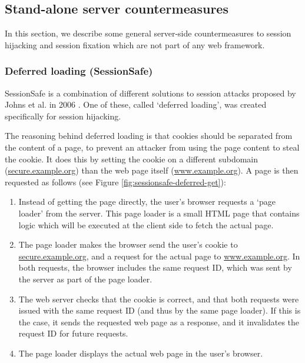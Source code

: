 \subsection{Stand-alone server countermeasures}\label{standalone-server}

In this section, we describe some general server-side countermeasures to session hijacking and session fixation which are not part of any web framework.

\subsubsection{Deferred loading (SessionSafe)}

SessionSafe is a combination of different solutions to session attacks proposed by Johns et al. in 2006 \cite{Johns2006}. One of these, called `deferred loading', was created specifically for session hijacking.

The reasoning behind deferred loading is that cookies should be separated from the content of a page, to prevent an attacker from using the page content to steal the cookie. It does this by setting the cookie on a different subdomain (\url{secure.example.org}) than the web page itself (\url{www.example.org}). A page is then requested as follows (see Figure \ref{fig:sessionsafe-deferred-get}):
\begin{enumerate}
	\item Instead of getting the page directly, the user's browser requests a `page loader' from the server. This page loader is a small HTML page that contains logic which will be executed at the client side to fetch the actual page.
	\item The page loader makes the browser send the user's cookie to \url{secure.example.org}, and a request for the actual page to \url{www.example.org}. In both requests, the browser includes the same request ID, which was sent by the server as part of the page loader.
	\item The web server checks that the cookie is correct, and that both requests were issued with the same request ID (and thus by the same page loader). If this is the case, it sends the requested web page as a response, and it invalidates the request ID for future requests.
	\item The page loader displays the actual web page in the user's browser.
\end{enumerate}

